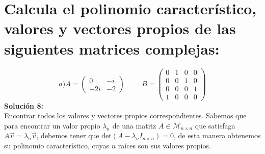 \section{Calcula el polinomio característico, valores y vectores propios de las siguientes matrices
complejas:}
\[a) A= \begin{pmatrix}0& -i\\
-2i &-2\end{pmatrix}\hspace{1cm}B= \begin{pmatrix}
0&1&0&0\\
0& 0 &1& 0\\
0&0&0&1\\
1&0&0&0\end{pmatrix}\]
\textbf{Soluci\'on 8:}\\
Encontrar todos los valores y vectores propios correspondientes.
    Sabemos que para encontrar un valor propio $\lambda_n$ de una matriz $A\in\mathcal{M}_{n\times n }$ que satisfaga $A\vec{v}=\lambda_n\vec{v}$, debemos tener que $\text{det}(A-\lambda_nI_{n\times n })=0$, de esta manera obtenemos su polinomio caracter\'istico, cuyas $n$ ra\'ices son sus valores propios.
